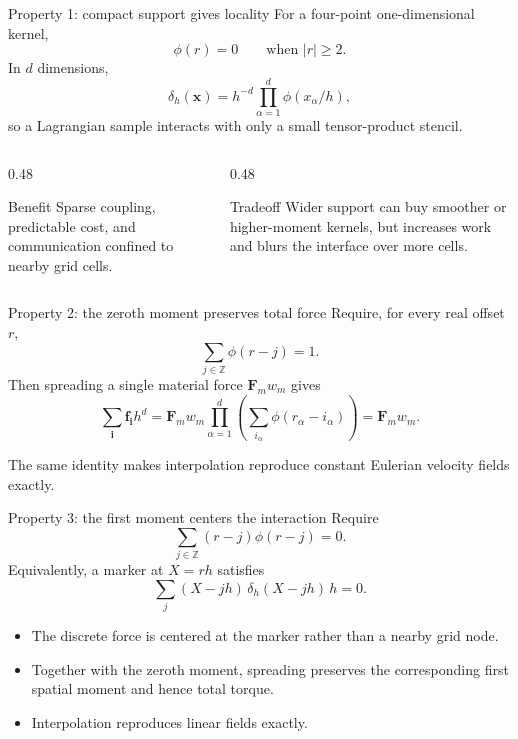 \documentclass[aspectratio=169,11pt]{beamer}
\newcommand{\xvec}{\bm{x}}
\newcommand{\fvec}{\bm{f}}
\newcommand{\Fvec}{\bm{F}}
\begin{document}
\begin{frame}{Property 1: compact support gives locality}
For a four-point one-dimensional kernel,
\[
  \phi(r)=0\qquad\text{when }|r|\ge2 .
\]
In \(d\) dimensions,
\[
  \delta_h(\xvec)
  =h^{-d}\prod_{\alpha=1}^{d}\phi(x_\alpha/h),
\]
so a Lagrangian sample interacts with only a small tensor-product stencil.

\begin{columns}[T,onlytextwidth]
  \begin{column}{0.48\textwidth}
  \begin{block}{Benefit}
  Sparse coupling, predictable cost, and communication confined to nearby grid cells.
  \end{block}
  \end{column}
  \begin{column}{0.48\textwidth}
  \begin{block}{Tradeoff}
  Wider support can buy smoother or higher-moment kernels, but increases work and blurs the interface over more cells.
  \end{block}
  \end{column}
\end{columns}
\end{frame}

\begin{frame}{Property 2: the zeroth moment preserves total force}
Require, for every real offset \(r\),
\[
  \boxed{\sum_{j\in\mathbb Z}\phi(r-j)=1 .}
\]
Then spreading a single material force \(\Fvec_m w_m\) gives
\[
  \sum_{\bm i}\fvec_{\bm i}h^d
  =\Fvec_m w_m
  \prod_{\alpha=1}^{d}\left(\sum_{i_\alpha}\phi(r_\alpha-i_\alpha)\right)
  =\Fvec_m w_m .
\]

\begin{punchbox}
The same identity makes interpolation reproduce constant Eulerian velocity fields exactly.
\end{punchbox}
\end{frame}

\begin{frame}{Property 3: the first moment centers the interaction}
Require
\[
  \boxed{\sum_{j\in\mathbb Z}(r-j)\phi(r-j)=0 .}
\]
Equivalently, a marker at \(X=rh\) satisfies
\[
  \sum_j (X-jh)\,\delta_h(X-jh)\,h=0 .
\]

\begin{itemize}\itemsep6pt
  \item The discrete force is centered at the marker rather than a nearby grid node.
  \item Together with the zeroth moment, spreading preserves the corresponding first spatial moment and hence total torque.
  \item Interpolation reproduces linear fields exactly.
\end{itemize}
\end{frame}
\end{document}
